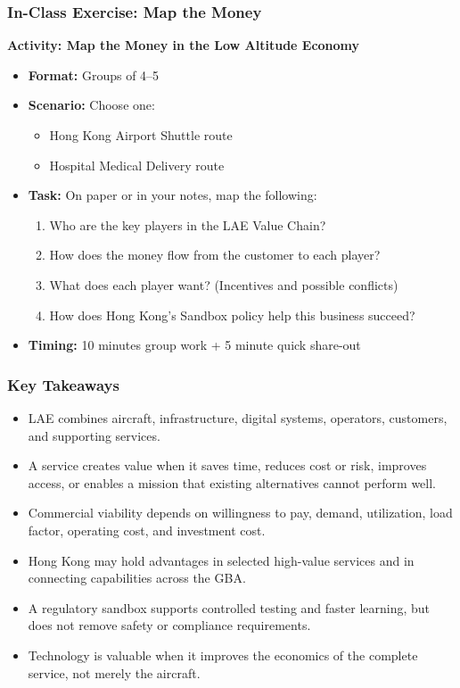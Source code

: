 \documentclass{beamer}
\begin{document}
\begin{frame}[t]
  \frametitle{In-Class Exercise: Map the Money}
 
  \textbf{Activity: Map the Money in the Low Altitude Economy}
  \begin{itemize}
    \item \textbf{Format:} Groups of 4–5
    \item \textbf{Scenario:} Choose one:
      \begin{itemize}
        \item Hong Kong Airport Shuttle route
        \item Hospital Medical Delivery route
      \end{itemize}
    \item \textbf{Task:} On paper or in your notes, map the following:
    \begin{enumerate}
        \item Who are the key players in the LAE Value Chain?
        \item How does the money flow from the customer to each player?
        \item What does each player want? (Incentives and possible conflicts)
        \item How does Hong Kong’s Sandbox policy help this business succeed?
    \end{enumerate}
    \item \textbf{Timing:} 10 minutes group work + 5 minute quick share-out
  \end{itemize}
\end{frame}
\begin{frame}[t]
  \frametitle{Key Takeaways}
  \begin{itemize}
    \item LAE combines aircraft, infrastructure, digital systems, operators, customers, and supporting services.
    \item A service creates value when it saves time, reduces cost or risk, improves access, or enables a mission that existing alternatives cannot perform well.
    \item Commercial viability depends on willingness to pay, demand, utilization, load factor, operating cost, and investment cost.
    \item Hong Kong may hold advantages in selected high-value services and in connecting capabilities across the GBA.
    \item A regulatory sandbox supports controlled testing and faster learning, but does not remove safety or compliance requirements.
    \item Technology is valuable when it improves the economics of the complete service, not merely the aircraft.
  \end{itemize}
\end{frame}
\end{document}
